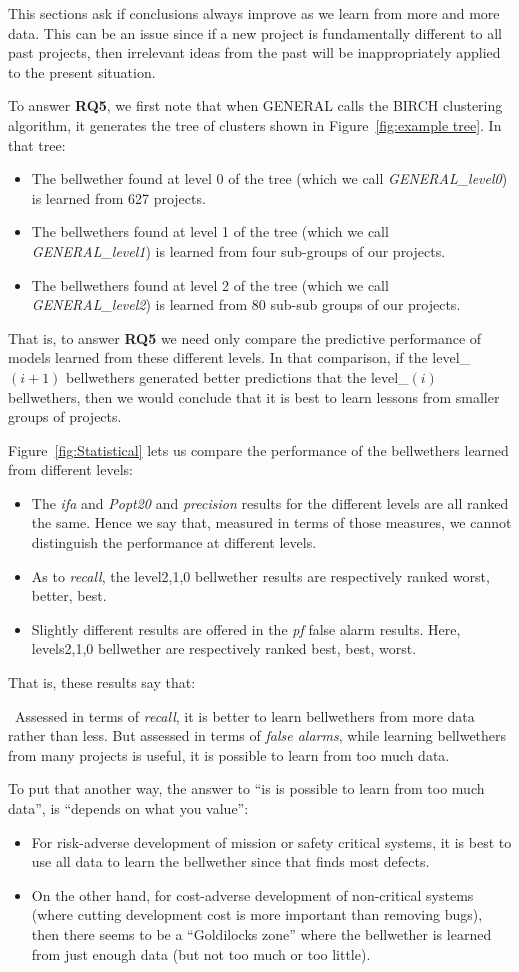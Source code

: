 \documentclass[10pt,journal,compsoc]{IEEEtran}
\newcommand{\fig}[1]{Figure~\ref{fig:#1}}
\newcommand{\bi}{\begin{itemize}}
\newcommand{\ei}{\end{itemize}}
\newenvironment{RQ}[1]%
{\noindent\begin{minipage}[c]{\linewidth}%
\begin{bclogo}[couleur=gray!20,%
                arrondi=0.1,logo=\bctrombone,%
                ombre=true%
                ]{{\small  ~#1}}}%
{\end{bclogo}\vspace{2mm}\end{minipage}}
\begin{document}
This sections ask if conclusions always improve as we learn from more and more data.
This can be an issue since if a new project
is fundamentally different to all past projects, then irrelevant ideas from the past will be
inappropriately applied to the present situation.  
 

To answer {\bf RQ5}, we first note that when GENERAL
calls the BIRCH clustering algorithm, it generates the tree
of clusters shown in  
\fig{example tree}. In that tree:
\bi
\item
The bellwether found at level 0 of the tree
(which we call {\em GENERAL\_level0}) is learned from 627 projects.
\item
The bellwethers found at level 1 of the tree
(which we call {\em GENERAL\_level1}) is learned from four sub-groups
of our projects.
\item
The bellwethers found at level 2 of the tree
(which we call {\em GENERAL\_level2}) is learned from 80
sub-sub groups of our projects.
\ei
That is, to answer {\bf RQ5} we need only compare the predictive performance
of models learned from these different levels. In that comparison,
if the level\_$(i+1)$ bellwethers generated better predictions
that the   level\_$(i)$ bellwethers, then we would conclude that it is best to learn lessons from smaller groups
of projects.

Figure~\ref{fig:Statistical} lets us
compare the performance of the bellwethers learned from different 
levels:
\bi
\item The {\em ifa} and {\em Popt20} 
and {\em precision}  results for the different levels
are all ranked the same.  Hence we say that, measured in terms of those 
measures, we cannot distinguish the performance at different levels.
\item 
As to {\em recall},   the level2,1,0 bellwether results are 
respectively ranked worst, better, best. 
\item
Slightly different results are offered in the {\em pf} false alarm results. Here,  levels2,1,0 bellwether are respectively ranked best, best, worst.
\ei
That is, these results say that:

\begin{RQ}
{Assessed in terms of {\em recall},
it is better to learn bellwethers from more data rather than less.
But assessed in terms of {\em false alarms}, 
while learning bellwethers
from many projects is useful, it is possible to learn from too much data.} 
\end{RQ}

To put that another way, the answer to ``is is possible to learn from too much data'', is ``depends on what you value'':
\bi
\item
For risk-adverse development of mission or safety critical
systems, it is best to use all data to learn the bellwether
since that finds most defects.
\item
On the other hand, for cost-adverse development of non-critical
systems (where cutting development cost
is more important than removing
bugs), then there seems to be a ``Goldilocks zone'' where
the bellwether is learned from just enough data (but not too much or too little).
\ei
\end{document}
